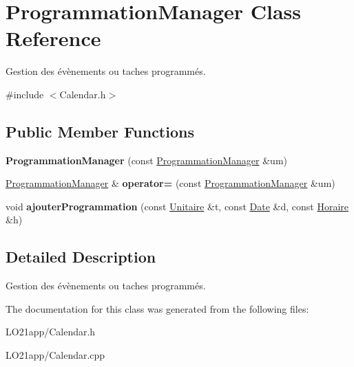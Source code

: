 \hypertarget{class_programmation_manager}{}\section{Programmation\+Manager Class Reference}
\label{class_programmation_manager}


Gestion des évènements ou taches programmés.  




{\ttfamily \#include $<$Calendar.\+h$>$}

\subsection*{Public Member Functions}
\begin{DoxyCompactItemize}
\item 
\hypertarget{class_programmation_manager_a2f846196abea78a761b71bdc5eb6afd6}{}{\bfseries Programmation\+Manager} (const \hyperlink{class_programmation_manager}{Programmation\+Manager} \&um)\label{class_programmation_manager_a2f846196abea78a761b71bdc5eb6afd6}

\item 
\hypertarget{class_programmation_manager_a547fb5ab78a25298cba270a13ef3e8a7}{}\hyperlink{class_programmation_manager}{Programmation\+Manager} \& {\bfseries operator=} (const \hyperlink{class_programmation_manager}{Programmation\+Manager} \&um)\label{class_programmation_manager_a547fb5ab78a25298cba270a13ef3e8a7}

\item 
\hypertarget{class_programmation_manager_aa53a6a561512c95c09baedc4f788c45b}{}void {\bfseries ajouter\+Programmation} (const \hyperlink{class_unitaire}{Unitaire} \&t, const \hyperlink{class_t_i_m_e_1_1_date}{Date} \&d, const \hyperlink{class_t_i_m_e_1_1_horaire}{Horaire} \&h)\label{class_programmation_manager_aa53a6a561512c95c09baedc4f788c45b}

\end{DoxyCompactItemize}


\subsection{Detailed Description}
Gestion des évènements ou taches programmés. 

The documentation for this class was generated from the following files\+:\begin{DoxyCompactItemize}
\item 
L\+O21app/Calendar.\+h\item 
L\+O21app/Calendar.\+cpp\end{DoxyCompactItemize}
